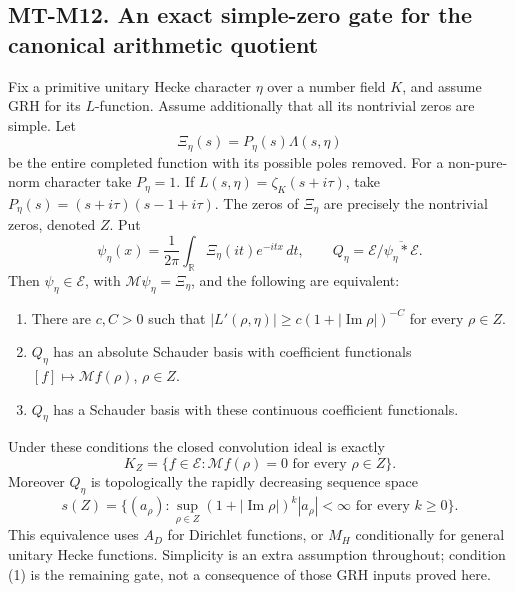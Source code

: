 \subsection*{MT-M12. An exact simple-zero gate for the canonical arithmetic quotient}
Fix a primitive unitary Hecke character $\eta$ over a number field
$K$, and assume GRH for its $L$-function. Assume additionally that
all its nontrivial zeros are simple. Let
\[
 \Xi_\eta(s)=P_\eta(s)\Lambda(s,\eta)
\]
be the entire completed function with its possible poles removed.
For a non-pure-norm character take $P_\eta=1$. If
$L(s,\eta)=\zeta_K(s+i\tau)$, take
$P_\eta(s)=(s+i\tau)(s-1+i\tau)$.
The zeros of $\Xi_\eta$ are precisely the nontrivial zeros, denoted
$Z$. Put
\[
 \psi_\eta(x)=\frac1{2\pi}\int_{\mathbb R}\Xi_\eta(it)e^{-itx}\,dt,
 \qquad Q_\eta=\mathcal E/\overline{\psi_\eta*\mathcal E}.
\]
Then $\psi_\eta\in\mathcal E$, with
$\mathcal M\psi_\eta=\Xi_\eta$, and the following are equivalent:
\begin{enumerate}
\item There are $c,C>0$ such that
$|L'(\rho,\eta)|\ge c(1+|\operatorname{Im}\rho|)^{-C}$ for
every $\rho\in Z$.
\item $Q_\eta$ has an absolute Schauder basis with coefficient
functionals $[f]\mapsto\mathcal Mf(\rho)$, $\rho\in Z$.
\item $Q_\eta$ has a Schauder basis with these continuous
coefficient functionals.
\end{enumerate}
Under these conditions the closed convolution ideal is exactly
\[
 K_Z=\{f\in\mathcal E:\mathcal Mf(\rho)=0
                              \text{ for every }\rho\in Z\}. \tag{MT-M12a}
\]
Moreover $Q_\eta$ is topologically the rapidly decreasing sequence
space
\[
 s(Z)=\{(a_\rho):\sup_{\rho\in Z}
       (1+|\operatorname{Im}\rho|)^k|a_\rho|<\infty
                                  \text{ for every }k\ge0\}. \tag{MT-M12b}
\]
This equivalence uses $A_D$ for Dirichlet functions, or $M_H$
conditionally for general unitary Hecke functions. Simplicity is
an extra assumption throughout; condition (1) is the remaining
gate, not a consequence of those GRH inputs proved here.

